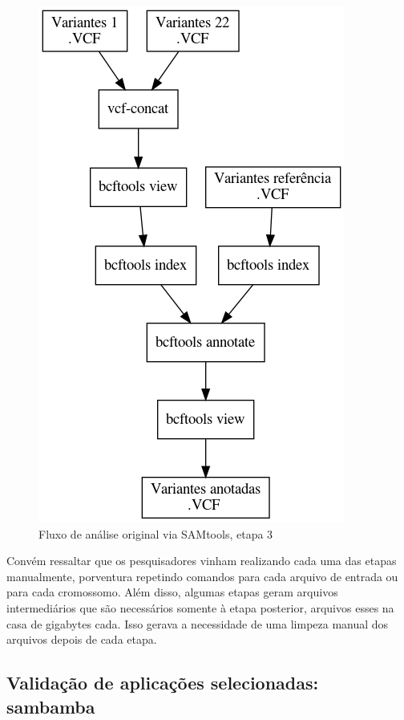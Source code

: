\documentclass[cic,tc]{iiufrgs}
\begin{document}
\begin{figure}
  \caption{Fluxo de análise original via SAMtools, etapa 3}
    \begin{center}
      \includegraphics[width=0.55\linewidth]{img/stage3_orig.png}
    \end{center}
    \label{fig:stage3_orig}
\end{figure}

Convém ressaltar que os pesquisadores vinham realizando cada uma das etapas
manualmente, porventura repetindo comandos para cada arquivo de entrada ou para
cada cromossomo. Além disso, algumas etapas geram arquivos intermediários que
são necessários somente à etapa posterior, arquivos esses na casa de gigabytes
cada. Isso gerava a necessidade de uma limpeza manual dos arquivos depois de
cada etapa.

\subsection{Validação de aplicações selecionadas: sambamba}
\label{sec:sambamba}
\end{document}
